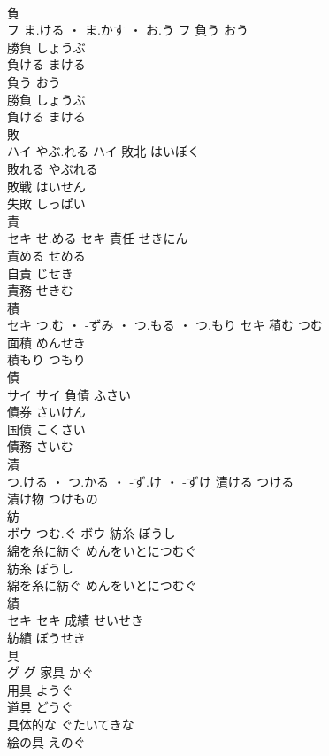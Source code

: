 \documentclass[8pt]{extreport}
\begin{document}
\begin{CJK}{UTF8}{min}
\\	負	
\\	フ	ま.ける ・ ま.かす ・ お.う	フ	負う	おう	
\\	勝負	しょうぶ	
\\	負ける	まける	
\\	負う	おう	
\\	勝負	しょうぶ	
\\	負ける	まける	
\\	敗	
\\	ハイ	やぶ.れる	ハイ	敗北	はいぼく	
\\	敗れる	やぶれる	
\\	敗戦	はいせん	
\\	失敗	しっぱい	
\\	責	
\\	セキ	せ.める	セキ	責任	せきにん	
\\	責める	せめる	
\\	自責	じせき	
\\	責務	せきむ	
\\	積	
\\	セキ	つ.む ・ -ずみ ・ つ.もる ・ つ.もり	セキ	積む	つむ	
\\	面積	めんせき	
\\	積もり	つもり	
\\	債	
\\	サイ		サイ	負債	ふさい	
\\	債券	さいけん	
\\	国債	こくさい	
\\	債務	さいむ	
\\	漬	
\\	つ.ける ・ つ.かる ・ -ず.け ・ -ずけ		漬ける	つける	
\\	漬け物	つけもの	
\\	紡	
\\	ボウ	つむ.ぐ	ボウ	紡糸	ぼうし	
\\	綿を糸に紡ぐ	めんをいとにつむぐ	
\\	紡糸	ぼうし	
\\	綿を糸に紡ぐ	めんをいとにつむぐ	
\\	績	
\\	セキ		セキ	成績	せいせき	
\\	紡績	ぼうせき	
\\	具	
\\	グ		グ	家具	かぐ	
\\	用具	ようぐ	
\\	道具	どうぐ	
\\	具体的な	ぐたいてきな	
\\	絵の具	えのぐ	

\end{CJK}
\end{document}
